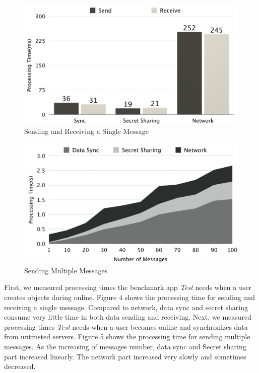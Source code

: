 \documentclass[twocolumn,10pt]{article}
\begin{document}
\begin{figure}[t]
	\centering
	\includegraphics[scale=0.12]{processing1}
	\caption{Sending and Receiving a Single Message}
\end{figure}

\begin{figure}[t]
	\centering
	\includegraphics[scale=0.12]{processing2}
	\caption{Sending Multiple Messages}
\end{figure}

First, we measured processing times the benchmark app \emph{Test} needs when a user creates objects during online. Figure 4 shows the processing time for sending and receiving a single message. Compared to network, data sync and secret sharing consume very little time in both data sending and receiving. Next, we measured processing times \emph{Test} needs when a user becomes online and synchronizes data from untrusted servers. Figure 5 shows the processing time for sending multiple messages. As the increasing of messages number, data sync and Secret sharing part increased linearly. The network part increased very slowly and sometimes decreased.
\end{document}
